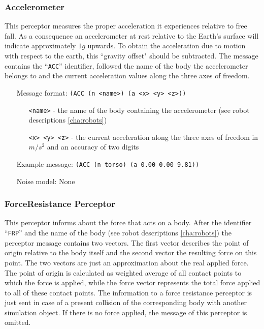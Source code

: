 \subsubsection{Accelerometer}
\label{sec:ACC}
This perceptor measures the proper acceleration it experiences
relative to free fall. As a consequence an accelerometer at rest
relative to the Earth's surface will indicate approximately $1 g$
upwards. To obtain the acceleration due to motion with respect to the
earth, this ``gravity offset" should be subtracted. The message contains the
``\texttt{ACC}'' identifier, followed the name of the body the accelerometer
belongs to and the current acceleration values along the three axes of freedom.
\begin{itemize}
	\item[Message format:] \texttt{(ACC (n <name>) (a <x> <y> <z>))}
		\begin{itemize}
		  \item[\texttt{<name>} -] the name of the body containing the
		  accelerometer (see robot descriptions \ref{cha:robots})
		  \item[\texttt{<x> <y> <z>} -] the current acceleration along the
		  three axes of freedom in $m/s^{2}$ and an accuracy of two digits
		\end{itemize}
	\item[Example message:] \texttt{(ACC (n torso) (a 0.00 0.00 9.81))}
	\item[Noise model:] None
\end{itemize}



\subsubsection{ForceResistance Perceptor}
\label{sec:FRP}
This perceptor informs about the force that acts on a body. After the identifier
``\texttt{FRP}'' and the name of the body (see robot descriptions
\ref{cha:robots}) the perceptor message contains two vectors. The first vector
describes the point of origin relative to the body itself and the second vector
the resulting force on this point. The two vectors are just an approximation
about the real applied force. The point of origin is calculated as weighted
average of all contact points to which the force is applied, while the force
vector represents the total force applied to all of these contact points. The
information to a force resistance perceptor is just sent in case of a present
collision of the corresponding body with another simulation object. If there is
no force applied, the message of this perceptor is omitted.

